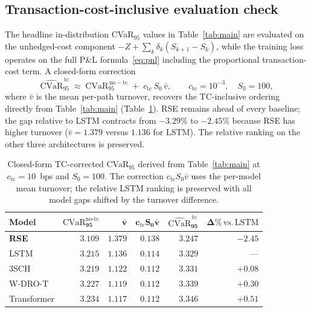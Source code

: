 \documentclass[10pt,letterpaper]{article}
\newcommand{\cvar}{\mathrm{CVaR}}
\begin{document}
\subsection{Transaction-cost-inclusive evaluation check}\label{sec:tc_check}

The headline in-distribution CVaR$_{95}$ values in
Table~\ref{tab:main} are evaluated on the unhedged-cost component
$-Z+\sum_k\delta_k(S_{k+1}-S_k)$, while the training loss operates
on the full P\&L formula~\eqref{eq:pnl} including the proportional
transaction-cost term. A closed-form correction
\[
\widehat{\cvar}^{\,\mathrm{tc}}_{95}
\;\approx\;\cvar_{95}^{\,\mathrm{no-tc}}
\;+\;c_{\mathrm{tc}}\,S_0\,\bar v,
\qquad c_{\mathrm{tc}}=10^{-3},\quad S_0=100,
\]
where $\bar v$ is the mean per-path turnover, recovers the
TC-inclusive ordering directly from Table~\ref{tab:main}
(Table~\ref{tab:tc_check}). RSE remains ahead of every baseline; the
gap relative to LSTM contracts from $-3.29\%$ to $-2.45\%$ because
RSE has higher turnover ($\bar v = 1.379$ versus $1.136$ for LSTM).
The relative ranking on the other three architectures is preserved.

\begin{table}[ht]
\centering\small
\caption{Closed-form TC-corrected CVaR$_{95}$ derived from
Table~\ref{tab:main} at $c_{\mathrm{tc}}=10$~bps and $S_0=100$.
The correction $c_{\mathrm{tc}} S_0\bar v$ uses the per-model mean
turnover; the relative LSTM ranking is preserved with all model gaps
shifted by the turnover difference.}
\label{tab:tc_check}
\begin{tabular}{@{}lrrrrr@{}}
\toprule
\textbf{Model} & $\boldsymbol{\cvar_{95}^{\mathrm{no\text{-}tc}}}$
& $\boldsymbol{\bar v}$ & $\mathbf{c_{\mathrm{tc}}S_0\bar v}$
& $\boldsymbol{\widehat{\cvar}_{95}^{\,\mathrm{tc}}}$
& $\boldsymbol{\Delta\%\,\mathrm{vs.\,LSTM}}$ \\\midrule
\textbf{RSE}  & $\mathbf{3.109}$ & $1.379$ & $0.138$ & $\mathbf{3.247}$ & $\mathbf{-2.45}$ \\
LSTM          & $3.215$          & $1.136$ & $0.114$ & $3.329$          & --- \\
3SCH          & $3.219$          & $1.122$ & $0.112$ & $3.331$          & $+0.08$ \\
W-DRO-T       & $3.227$          & $1.119$ & $0.112$ & $3.339$          & $+0.30$ \\
Transformer   & $3.234$          & $1.117$ & $0.112$ & $3.346$          & $+0.51$ \\
\bottomrule
\end{tabular}
\end{table}
\end{document}
